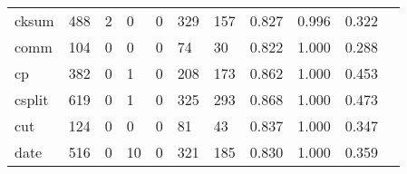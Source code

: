 \begin{longtable}{lp{1.2cm}p{1.2cm}p{1.2cm}p{1.2cm}p{1.2cm}p{1.2cm}p{1.2cm}p{1.2cm}p{1.2cm}p{1.2cm}}
cksum     &                                   488 &                                                  2 &                                                  0 &                                                  0 &                                                329 &                                                157 &                                         0.827 &                                              0.996 &                                              0.322 \\
comm      &                                   104 &                                                  0 &                                                  0 &                                                  0 &                                                 74 &                                                 30 &                                         0.822 &                                              1.000 &                                              0.288 \\
cp        &                                   382 &                                                  0 &                                                  1 &                                                  0 &                                                208 &                                                173 &                                         0.862 &                                              1.000 &                                              0.453 \\
csplit    &                                   619 &                                                  0 &                                                  1 &                                                  0 &                                                325 &                                                293 &                                         0.868 &                                              1.000 &                                              0.473 \\
cut       &                                   124 &                                                  0 &                                                  0 &                                                  0 &                                                 81 &                                                 43 &                                         0.837 &                                              1.000 &                                              0.347 \\
date      &                                   516 &                                                  0 &                                                 10 &                                                  0 &                                                321 &                                                185 &                                         0.830 &                                              1.000 &                                              0.359 \\

\end{longtable}
